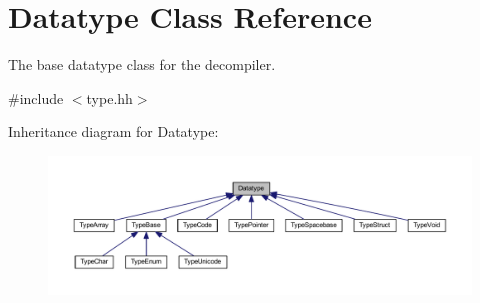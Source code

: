 \hypertarget{class_datatype}{}\section{Datatype Class Reference}
\label{class_datatype}


The base datatype class for the decompiler.  




{\ttfamily \#include $<$type.\+hh$>$}



Inheritance diagram for Datatype\+:
\nopagebreak
\begin{figure}[H]
\begin{center}
\leavevmode
\includegraphics[width=350pt]{class_datatype__inherit__graph}
\end{center}
\end{figure}
